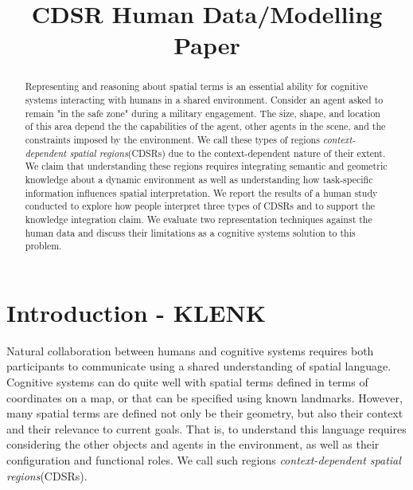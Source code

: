 \documentclass[11pt,letterpaper]{article}
\begin{document}
 

\title{CDSR Human Data/Modelling Paper}
 
\vskip 0.2in
 
\begin{abstract}
Representing and reasoning about spatial terms is an essential ability for cognitive systems interacting with humans in a shared environment.  Consider an agent asked to remain "in the safe zone" during a military engagement.  The size, shape, and location of this area depend the the capabilities of the agent, other agents in the scene, and the constraints imposed by the environment.  We call these types of regions \textit{context-dependent spatial regions}(CDSRs) due to the context-dependent nature of their extent.  We claim that understanding these regions requires integrating semantic and geometric knowledge about a dynamic environment as well as understanding how task-specific information influences spatial interpretation.  We report the results of a human study conducted to explore how people interpret three types of CDSRs and to support the knowledge integration claim.  We evaluate two representation techniques against the human data and discuss their limitations as a cognitive systems solution to this problem.
\end{abstract}

\section{Introduction - KLENK} 
Natural collaboration between humans and cognitive systems requires both participants to communicate using a shared understanding of spatial language.  Cognitive systems can do quite well with spatial terms defined in terms of coordinates on a map, or that can be specified using known landmarks.  However, many spatial terms are defined not only be their geometry, but also their context and their relevance to current goals.  That is, to understand this language requires considering the other objects and agents in the environment, as well as their configuration and functional roles.  We call such regions \textit{context-dependent spatial regions}(CDSRs).
\end{document}
